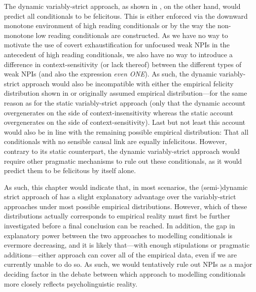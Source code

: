 The dynamic variably-strict approach, as shown in , on the other hand, would predict all conditionals to be felicitous. This is either enforced via the downward monotone environment of high reading conditionals or by the way the non-monotone low reading conditionals are constructed. As we have no way to motivate the use of covert exhaustification for unfocused weak NPIs in the antecedent of high reading conditionals, we also have no way to introduce a difference in context-sensitivity (or lack thereof) between the different types of weak NPIs (and also the expression \textit{even \MakeUppercase{one}}). As such, the dynamic variably-strict approach would also be incompatible with either the empirical felicity distribution shown in  or  originally assumed empirical distribution---for the same reason as for the static variably-strict approach (only that the dynamic account overgenerates on the side of context-insensitivity whereas the static account overgenerates on the side of context-sensitivity). Last but not least this account would also be in line with the remaining possible empirical distribution: That all conditionals with no sensible causal link are equally infelicitous. However, contrary to its static counterpart, the dynamic variably-strict approach would require other pragmatic mechanisms to rule out these conditionals, as it would predict them to be felicitous by itself alone.

As such, this chapter would indicate that, in most scenarios, the (semi-)dynamic strict approach of \textcite{Fintel2001} has a slight explanatory advantage over the variably-strict approaches under most possible empirical distributions. However, which of these distributions actually corresponds to empirical reality must first be further investigated before a final conclusion can be reached. In addition, the gap in explanatory power between the two approaches to modelling conditionals is evermore decreasing, and it is likely that---with enough stipulations or pragmatic additions---either approach can cover all of the empirical data, even if we are currently unable to do so. As such, we would tentatively rule out NPIs as a major deciding factor in the debate between which approach to modelling conditionals more closely reflects psycholinguistic reality.
